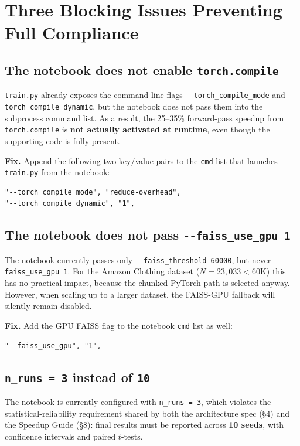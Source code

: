\documentclass[11pt,a4paper]{article}
\begin{document}
\section{Three Blocking Issues Preventing Full Compliance}

\subsection{The notebook does not enable \texttt{torch.compile}}
\texttt{train.py} already exposes the command-line flags
\texttt{-{}-torch\_compile\_mode} and \texttt{-{}-torch\_compile\_dynamic}, but the
notebook does not pass them into the subprocess command list. As a result, the
25--35\% forward-pass speedup from \texttt{torch.compile} is \textbf{not actually
activated at runtime}, even though the supporting code is fully present.

\textbf{Fix.} Append the following two key/value pairs to the \texttt{cmd} list
that launches \texttt{train.py} from the notebook:

\begin{lstlisting}
"--torch_compile_mode", "reduce-overhead",
"--torch_compile_dynamic", "1",
\end{lstlisting}

\subsection{The notebook does not pass \texttt{-{}-faiss\_use\_gpu 1}}
The notebook currently passes only \texttt{-{}-faiss\_threshold 60000}, but never
\texttt{-{}-faiss\_use\_gpu 1}. For the Amazon Clothing dataset
($N{=}23{,}033 < 60\text{K}$) this has no practical impact, because the chunked
PyTorch path is selected anyway. However, when scaling up to a larger dataset,
the FAISS-GPU fallback will silently remain disabled.

\textbf{Fix.} Add the GPU FAISS flag to the notebook \texttt{cmd} list as well:

\begin{lstlisting}
"--faiss_use_gpu", "1",
\end{lstlisting}

\subsection{\texttt{n\_runs = 3} instead of \texttt{10}}
The notebook is currently configured with \texttt{n\_runs = 3}, which violates the
statistical-reliability requirement shared by both the architecture spec
(\S4) and the Speedup Guide (\S8): final results must be reported across
\textbf{10 seeds}, with confidence intervals and paired $t$-tests.
\end{document}
